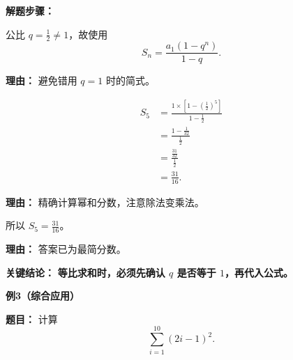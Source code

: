 \begin{examplebox}
	\textbf{\textcolor{CExample}{解题步骤：}}
	\begin{description}[style=nextline, leftmargin=2.8em, labelsep=0.5em, itemsep=0.45em]
		\item[\textbf{第一步（判断公式）：}]
		      公比 \(q=\frac12\neq1\)，故使用
		      \[
			      S_n=\frac{a_1(1-q^n)}{1-q}.
		      \]
		      \par\textbf{理由：} 避免错用 \(q=1\) 时的简式。
		\item[\textbf{第二步（代入计算）：}]
		      \[
			      \begin{aligned}
				      S_5
				       & =\frac{1\times\left[1-\left(\frac12\right)^5\right]}{1-\frac12} \\
				       & =\frac{1-\frac{1}{32}}{\frac12}                                 \\
				       & =\frac{\frac{31}{32}}{\frac12}                                  \\
				       & =\frac{31}{16}.
			      \end{aligned}
		      \]
		      \par\textbf{理由：} 精确计算幂和分数，注意除法变乘法。
		\item[\textbf{第三步（整理结果）：}]
		      所以 \(S_5=\frac{31}{16}\)。
		      \par\textbf{理由：} 答案已为最简分数。
	\end{description}

	\textbf{\textcolor{CExample}{关键结论：}}
	\textbf{等比求和时，必须先确认 \(q\) 是否等于 \(1\)，再代入公式。}

	\medskip
	\textbf{\textcolor{CExample}{例3（综合应用）}}

	\textbf{\textcolor{CExample}{题目：}}
	计算
	\[
		\sum_{i=1}^{10}(2i-1)^2.
	\]


\end{examplebox}
